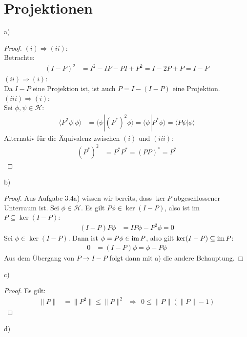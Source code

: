 \documentclass[a4paper,12pt]{article}
\newcommand{\brak}{}
\newcommand{\kla}{}
\newcommand{\tecxt}{}
\begin{document}
\section{Projektionen}
a)
\begin{proof}
$(i)\Rightarrow(ii)$:\\
Betrachte:
\begin{align*}
\kla\left( {I-P} \right)^2&=I^2-IP-PI+P^2=I-2P+P=I-P
\end{align*}
$(ii)\Rightarrow(i)$:\\
Da $I-P$ eine Projektion ist, ist auch $P=I-(I-P)$ eine Projektion.
$(iii)\Rightarrow(i)$:\\
Sei $\phi,\psi\in\mathcal{H}$:
\begin{align*}
\brak\langle {P^2\psi}| {\phi}\rangle&=\brak\langle {\psi}| {(P^\ast)^2\phi}\rangle=\brak\langle {\psi}| {P^\ast\phi}\rangle=\brak\langle {P\psi}| {\phi}\rangle
\end{align*}
Alternativ für die Äquivalenz zwischen $(i)$ und $(iii)$:
\begin{align*}
(P^\ast)^2&=P^\ast P^\ast = (PP)^\ast = P^\ast
\end{align*}
\end{proof}
b)
\begin{proof}
Aus Aufgabe 3.4a) wissen wir bereits, dass $\ker P$ abgeschlossener Unterraum ist. Sei $\phi\in\mathcal{H}$. Es gilt $P\phi\in\ker (I-P)$, also ist im\,$P\subseteq\ker (I-P)$:
\begin{align*}
(I-P)P\phi&=IP\phi-P^2\phi=0
\end{align*}
Sei $\phi\in\ker (I-P)$. Dann ist $\phi=P\phi\in\tecxt\text{im\,}P$, also gilt $\ker(I-P)\subseteq\tecxt\text{im\,}P$:
\begin{align*}
0&=(I-P)\phi=\phi-P\phi
\end{align*}
Aus dem Übergang von $P\rightarrow I-P$ folgt dann mit a) die andere Behauptung.
\end{proof}
c)
\begin{proof}
Es gilt:
\begin{align*}
\|P\|&=\|P^2\|\le\|P\|^2\ \ \Rightarrow\ \ 0\le\|P\|(\|P\|-1)
\end{align*}
\end{proof}
d)
\end{document}
